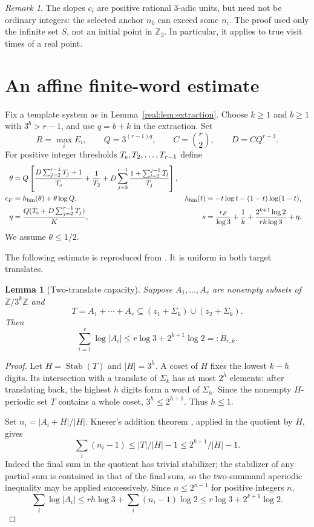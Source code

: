 \documentclass[11pt]{article}
\newtheorem{lemma}[theorem]{Lemma}
\theoremstyle{definition}
\theoremstyle{remark}
\newtheorem{remark}[theorem]{Remark}
\newcommand{\Z}{\mathbb Z}
\newcommand{\hbin}{h_{\mathrm{bin}}}
\newcommand{\Stab}{\operatorname{Stab}}
\begin{document}
\begin{remark}\label{real:rem:rational}
The slopes $c_i$ are positive rational 3-adic units, but need not be
ordinary integers: the selected anchor $n_0$ can exceed some $n_i$.
The proof used only the infinite set $S$, not an initial point in
$\Z_3$. In particular, it applies to true visit times of a real point.
\end{remark}

\section{An affine finite-word estimate}\label{sec:real:finite}
Fix a template system as in Lemma~\ref{real:lem:extraction}. Choose
$k\ge1$ and $b\ge1$ with $3^b>r-1$, and use $q=b+k$ in the
extraction. Set
\[
 R=\max_iE_i,\qquad Q=3^{(r-1)q},\qquad
 C=\binom r2,\qquad D=CQ^{r-3}.
\]
For positive integer thresholds $T_{\rm s},T_2,\ldots,T_{r-1}$ define
\begin{align}
 \theta&=Q\left[\frac{D\sum_{j=2}^{r-1}T_j+1}{T_{\rm s}}
 +\frac1{T_2}+D\sum_{j=3}^{r-1}
          \frac{1+\sum_{l=2}^{j-1}T_l}{T_j}\right],\label{real:eq:theta}\\
 \epsilon_F&=\hbin(\theta)+\theta\log Q,
 &\hbin(t)&=-t\log t-(1-t)\log(1-t),\label{real:eq:epsF}\\
 \eta&=\frac{Q(T_{\rm s}+D\sum_{j=2}^{r-1}T_j)}{K},
 &s&=\frac{\epsilon_F}{\log3}+\frac1k+
       \frac{2^{k+1}\log2}{rk\log3}+\eta.\label{real:eq:s}
\end{align}
We assume $\theta\le1/2$.

The following estimate is reproduced from \cite[Lemma~2.1]{Core}.
It is uniform in both target translates.

\begin{lemma}[Two-translate capacity]\label{vone:lem:capacity}
Suppose $A_1,\ldots,A_r$ are nonempty subsets of $\Z/3^k\Z$ and
\[
 T=A_1+\cdots+A_r\subseteq(z_1+\Sigma_k)\cup(z_2+\Sigma_k).
\]
Then
\begin{equation}\label{vone:eq:capacity}
 \sum_{i=1}^r\log|A_i|\le r\log3+2^{k+1}\log2=:B_{r,k}.
\end{equation}
\end{lemma}
\begin{proof}
Let $H=\Stab(T)$ and $|H|=3^h$. A coset of $H$ fixes the lowest
$k-h$ digits. Its intersection with a translate of $\Sigma_k$ has at
most $2^h$ elements: after translating back, the highest $h$ digits
form a word of $\Sigma_h$. Since the nonempty $H$-periodic set $T$
contains a whole coset, $3^h\le2^{h+1}$. Thus $h\le1$.

Set $n_i=|A_i+H|/|H|$. Kneser's addition theorem \cite{DeVos}, applied
in the quotient by $H$, gives
\[
 \sum_i(n_i-1)\le |T|/|H|-1\le 2^{k+1}/|H|-1.
\]
Indeed the final sum in the quotient has trivial stabilizer; the
stabilizer of any partial sum is contained in that of the final sum,
so the two-summand aperiodic inequality may be applied successively.
Since $n\le2^{n-1}$ for positive integers $n$,
\[
 \sum_i\log|A_i|\le rh\log3+\sum_i(n_i-1)\log2
                  \le r\log3+2^{k+1}\log2.
\]
\end{proof}
\end{document}
